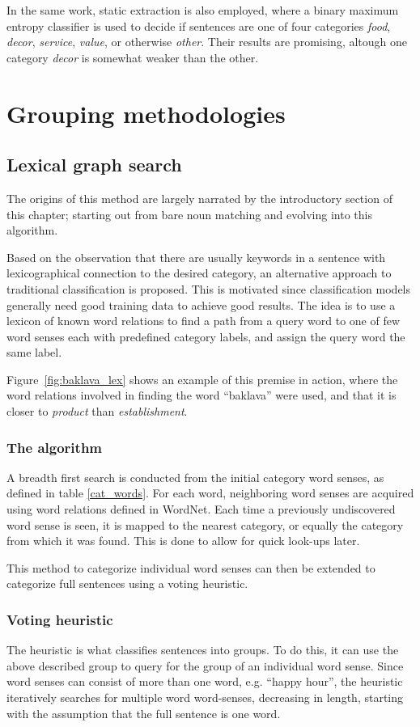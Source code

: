 \documentclass[a4paper,11pt]{kth-mag}
\begin{document}
In the same work, static extraction is also employed, where a binary maximum entropy classifier
is used to decide if sentences are one of four categories \emph{food}, \emph{decor}, \emph{service}, \emph{value},
or otherwise \emph{other}.
Their results are promising, altough one category \emph{decor} is somewhat weaker than the other.

\section{Grouping methodologies}
\subsection{Lexical graph search}
The origins of this method are largely narrated by the introductory section of this chapter;
starting out from bare noun matching and evolving into this algorithm.

Based on the observation that there are usually keywords in a sentence with lexicographical
connection to the desired category, an alternative approach to traditional classification is proposed.
This is motivated since classification models generally need good training data to achieve good results.
The idea is to use a lexicon of known word relations to find a path from a query word to one of
few word senses each with predefined category labels, and assign the query word the same label.

Figure~\ref{fig:baklava_lex} shows an example of this premise in action,
where the word relations involved in finding the word ``baklava'' were used,
and that it is closer to \emph{product} than \emph{establishment}.

\subsubsection{The algorithm}
A breadth first search is conducted from the initial category word senses,
as defined in table \ref{cat_words}.
For each word, neighboring word senses are acquired using word relations
defined in WordNet. Each time a previously undiscovered word sense is seen, it is mapped
to the nearest category, or equally the category from which it was found.
This is done to allow for quick look-ups later.

This method to categorize individual word senses can then be extended to categorize full
sentences using a voting heuristic.

\subsubsection{Voting heuristic}
The heuristic is what classifies sentences into groups.
To do this, it can use the above described group to query for the group of an
individual word sense. Since word senses can consist of more than one word,
e.g. ``happy hour'', the heuristic iteratively searches for multiple word word-senses,
decreasing in length, starting with the assumption that the full sentence is one word.
\end{document}
